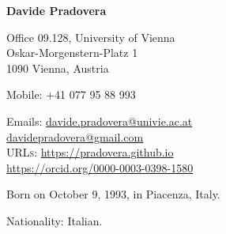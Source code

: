 \documentclass[11pt]{article} %
\begin{document}

\begin{minipage}[c]{.75\textwidth}
{\huge\bfseries Davide Pradovera} %
\bigskip\bigskip\medskip %

Office 09.128, University of Vienna \\
Oskar-Morgenstern-Platz 1 \\
1090 Vienna, Austria
\medskip %

Mobile: +41 077 95 88 993 %
\medskip %

Emails: \href{mailto:davide.pradovera@univie.ac.at}{davide.pradovera@univie.ac.at}\\ %
\phantom{Emails: }\href{mailto:davidepradovera@gmail.com}{davidepradovera@gmail.com}\\ %
\textsc{URLs}: \href{https://pradovera.github.io}{https://pradovera.github.io}\\ %
\href{https://orcid.org/0000-0003-0398-1580}{https://orcid.org/0000-0003-0398-1580}\\ %
\end{minipage}\hfill%
\begin{minipage}[c]{.225\textwidth}
\end{minipage}\hfill%

\smallskip %


Born on October 9, 1993, in Piacenza, Italy. %

Nationality: Italian. %
\end{document}
